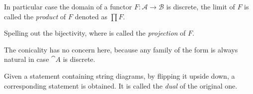 \begin{definition}[Product]
In particular case the domain of a functor $F : \mathcal{A} \to \mathcal{B}$ is discrete, %
the limit of $F$ is called the \emph{product }of $F$ denoted as $\textstyle\prod F$. %
\end{definition}

\begin{definition}[Projection]
\label{projection}
Spelling out the bijectivity,
where %
is called the \emph{projection} of $F$. 
\end{definition}

\begin{remark}
The conicality has no concern here, because any family of the form
is always natural in case $\cat A$ is discrete.
\end{remark}

\begin{definition}[Dual]
Given a statement containing string diagrams, by flipping it upside down, %
a corresponding statement is obtained. It is called the \emph{dual} of the original one.
\end{definition}

